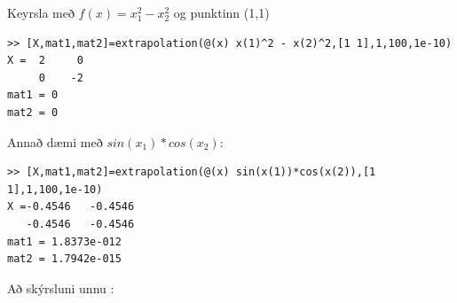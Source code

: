 \documentclass[a4]{article}
\begin{document}
Keyrsla með $f(x) = x^2_1 - x^2_2$ og punktinn (1,1)
\begin{lstlisting}
>> [X,mat1,mat2]=extrapolation(@(x) x(1)^2 - x(2)^2,[1 1],1,100,1e-10)
X =  2     0
     0    -2
mat1 = 0
mat2 = 0
\end{lstlisting}

Annað dæmi með $sin(x_1)*cos(x_2)$:
\begin{lstlisting}
>> [X,mat1,mat2]=extrapolation(@(x) sin(x(1))*cos(x(2)),[1 1],1,100,1e-10)
X =-0.4546   -0.4546
   -0.4546   -0.4546
mat1 = 1.8373e-012
mat2 = 1.7942e-015
\end{lstlisting}
\vspace{20 mm}
Að skýrsluni unnu :
\hspace{0.5cm} \makebox[1.5in]{\hrulefill}
\hspace{0.5cm} \makebox[1.5in]{\hrulefill}
\hspace{0.5cm} \makebox[1.5in]{\hrulefill}
\end{document}
